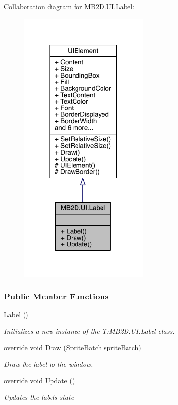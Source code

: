 Collaboration diagram for M\+B2\+D.\+U\+I.\+Label\+:
\nopagebreak
\begin{figure}[H]
\begin{center}
\leavevmode
\includegraphics[width=182pt]{class_m_b2_d_1_1_u_i_1_1_label__coll__graph}
\end{center}
\end{figure}
\subsubsection*{Public Member Functions}
\begin{DoxyCompactItemize}
\item 
\hyperlink{class_m_b2_d_1_1_u_i_1_1_label_af2e14465a2e06ca65487481d543de78c}{Label} ()
\begin{DoxyCompactList}\small\item\em Initializes a new instance of the T\+:\+M\+B2\+D.\+U\+I.\+Label class. \end{DoxyCompactList}\item 
override void \hyperlink{class_m_b2_d_1_1_u_i_1_1_label_a976ec212cedf0710fb35cd578e1e51b1}{Draw} (Sprite\+Batch sprite\+Batch)
\begin{DoxyCompactList}\small\item\em Draw the label to the window. \end{DoxyCompactList}\item 
override void \hyperlink{class_m_b2_d_1_1_u_i_1_1_label_ae4cc8f88f75b0d16d983bb754d214ef4}{Update} ()
\begin{DoxyCompactList}\small\item\em Updates the labels state \end{DoxyCompactList}\end{DoxyCompactItemize}
